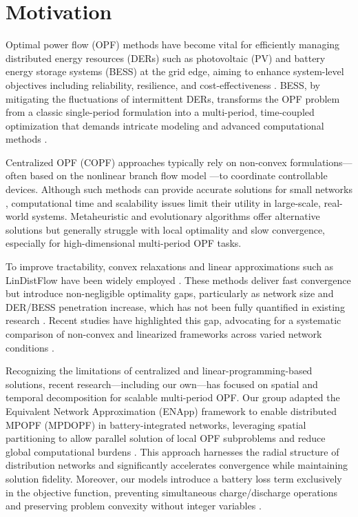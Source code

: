 \clearpage
\section{Motivation}

Optimal power flow (OPF) methods have become vital for efficiently managing distributed energy resources (DERs) such as photovoltaic (PV) and battery energy storage systems (BESS) at the grid edge, aiming to enhance system-level objectives including reliability, resilience, and cost-effectiveness \cite{Jha2024, Nazir2019Jun}. BESS, by mitigating the fluctuations of intermittent DERs, transforms the OPF problem from a classic single-period formulation into a multi-period, time-coupled optimization that demands intricate modeling and advanced computational methods \cite{Jha2024, ddp_sugar_01}.

Centralized OPF (COPF) approaches typically rely on non-convex formulations—often based on the nonlinear branch flow model \cite{bfm01}—to coordinate controllable devices. Although such methods can provide accurate solutions for small networks \cite{Gabash, Jha2024, ddp_sugar_01}, computational time and scalability issues limit their utility in large-scale, real-world systems. Metaheuristic and evolutionary algorithms \cite{Nazir2018Jun} offer alternative solutions but generally struggle with local optimality and slow convergence, especially for high-dimensional multi-period OPF tasks.

To improve tractability, convex relaxations and linear approximations such as LinDistFlow \cite{Gan} have been widely employed \cite{Jha2024, Gan, ddp_sugar_01}. These methods deliver fast convergence but introduce non-negligible optimality gaps, particularly as network size and DER/BESS penetration increase, which has not been fully quantified in existing research \cite{Jha2024}. Recent studies have highlighted this gap, advocating for a systematic comparison of non-convex and linearized frameworks across varied network conditions \cite{Jha2024, Gan}.

Recognizing the limitations of centralized and linear-programming-based solutions, recent research—including our own—has focused on spatial and temporal decomposition for scalable multi-period OPF. Our group adapted the Equivalent Network Approximation (ENApp) framework to enable distributed MPOPF (MPDOPF) in battery-integrated networks, leveraging spatial partitioning to allow parallel solution of local OPF subproblems and reduce global computational burdens \cite{Jha2025}. This approach harnesses the radial structure of distribution networks and significantly accelerates convergence while maintaining solution fidelity. Moreover, our models introduce a battery loss term exclusively in the objective function, preventing simultaneous charge/discharge operations and preserving problem convexity without integer variables \cite{Jha2025}.

